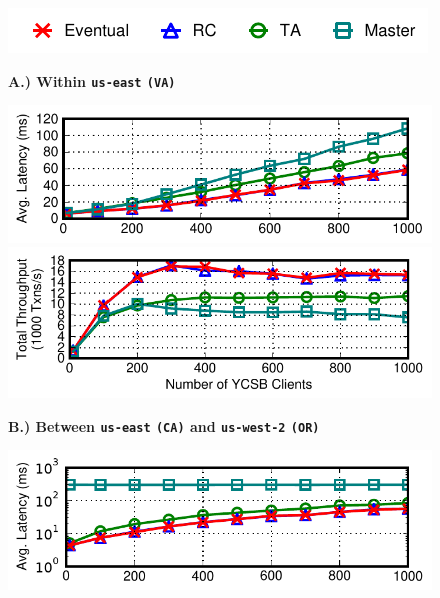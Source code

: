 \begin{figure}[t!]
\begin{center}
\hspace{2em}\includegraphics[width=.8\columnwidth]{figs/strategylegend.pdf}
\end{center}\vspace{-2em}
\begin{center}\small\textbf{A.) Within \texttt{us-east} \texttt{(VA)}}\end{center}\vspace{-1.5em}
\includegraphics[width=\figfactor\columnwidth]{figs/finals/2lan-threads-lats.pdf}\vspace{-.5em}
\includegraphics[width=\figfactor\columnwidth]{figs/finals/2lan-threads-thru.pdf}\vspace{-.75em}
\begin{center}\small\textbf{B.) Between \texttt{us-east} \texttt{(CA)} and \texttt{us-west-2} \texttt{(OR)}}\end{center}\vspace{-1.5em}
\includegraphics[width=\figfactor\columnwidth]{figs/finals/2wan-threads-lats-log.pdf}\vspace{-.5em}

\end{figure}
